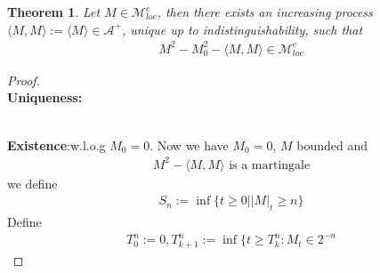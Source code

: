 \documentclass[a4paper,11pt]{book}
\newtheorem{theorem}{Theorem}[section]
\theoremstyle{definition}
\theoremstyle{remark}
\begin{document}
\begin{theorem}
	Let $M \in \mathcal{M}_{loc}^c$, then there exists an increasing process $\langle M , M \rangle:= \langle M \rangle \in \mathcal{A}^+$, unique up to indistinguishability, such that 
	\begin{align*}
		M^2 - M_0^2 - \langle M, M \rangle \in \mathcal{M}_{loc}^c
	\end{align*}
\end{theorem}
\begin{proof}\quad\\
\textbf{Uniqueness:}

\quad\\
\textbf{Existence}:w.l.o.g $M_0 = 0$. Now we have $M_0 = 0$,  $M$ bounded and 
\begin{align*}
	M^2 - \langle M, M \rangle \text{ is a martingale}
\end{align*}
we define
\begin{align*}
	S_n:= \inf\{ t \ge 0 | |M|_t \ge n\}
\end{align*}
Define
\begin{align*}
	T_0^n:= 0, T_{k +1}^n:= \inf\{ t \ge T_k^n: M_t \in 2^{-n}
\end{align*}
\end{proof}
\end{document}
